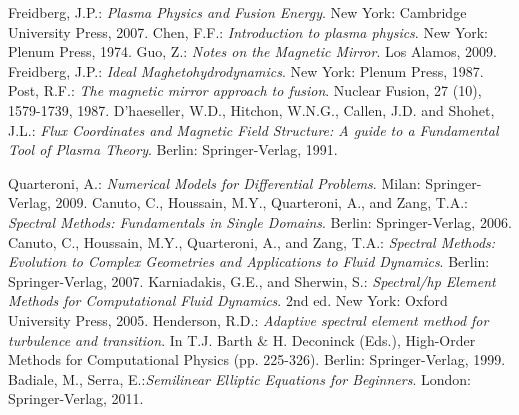 \begin{thebibliography}{}
 Freidberg, J.P.: \textit{Plasma Physics and Fusion Energy}. New York: Cambridge University Press, 2007.
 Chen, F.F.: \textit{Introduction to plasma physics}. New York: Plenum Press, 1974.
 Guo, Z.: \textit{Notes on the Magnetic Mirror}. Los Alamos, 2009.
 Freidberg, J.P.: \textit{Ideal Maghetohydrodynamics}. New York: Plenum Press, 1987.
 Post, R.F.: \textit{The magnetic mirror approach to fusion}. Nuclear Fusion, 27 (10), 1579-1739, 1987.
 D'haeseller, W.D., Hitchon, W.N.G., Callen, J.D. and Shohet, J.L.: \textit{Flux Coordinates and Magnetic Field Structure: A guide to a Fundamental Tool of Plasma Theory}. Berlin: Springer-Verlag, 1991.

 Quarteroni, A.: \textit{Numerical Models for Differential Problems}. Milan: Springer-Verlag, 2009.
 Canuto, C., Houssain, M.Y., Quarteroni, A., and Zang, T.A.: \textit{Spectral Methods: Fundamentals in Single Domains}. Berlin: Springer-Verlag, 2006.
 Canuto, C., Houssain, M.Y., Quarteroni, A., and Zang, T.A.: \textit{Spectral Methods: Evolution to Complex Geometries and Applications to Fluid Dynamics}. Berlin:
Springer-Verlag, 2007.
 Karniadakis, G.E., and Sherwin, S.: \textit{Spectral/hp Element Methods for Computational Fluid Dynamics}. 2nd ed. New York: Oxford University Press, 2005.
 Henderson, R.D.: \textit{Adaptive spectral element method for turbulence and transition}. In T.J. Barth \& H. Deconinck (Eds.), High-Order Methods for Computational Physics (pp. 225-326). Berlin: Springer-Verlag, 1999.
 Badiale, M., Serra, E.:\textit{Semilinear Elliptic Equations for Beginners}. London: Springer-Verlag, 2011.


\end{thebibliography}
